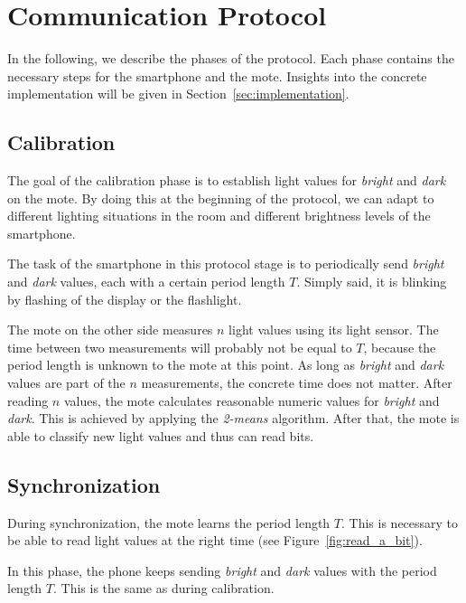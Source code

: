 \documentclass{ewsn-proc} %
\begin{document}
\section{Communication Protocol}
\label{sec:communication_protocol}

In the following, we describe the phases of the protocol.
Each phase contains the necessary steps for the smartphone and the mote.
Insights into the concrete implementation will be given in Section~\ref{sec:implementation}.

\subsection{Calibration}
\label{sub:calibration}

The goal of the calibration phase is to establish light values for \textit{bright} and \textit{dark} on the mote.
By doing this at the beginning of the protocol, we can adapt to different lighting situations in the room and different brightness levels of the smartphone.

The task of the smartphone in this protocol stage is to periodically send \textit{bright} and \textit{dark} values, each with a certain period length $T$.
Simply said, it is blinking by flashing of the display or the flashlight.

The mote on the other side measures $n$ light values using its light sensor.
The time between two measurements will probably not be equal to $T$, because the period length is unknown to the mote at this point.
As long as \textit{bright} and \textit{dark} values are part of the $n$ measurements, the concrete time does not matter.
After reading $n$ values, the mote calculates reasonable numeric values for \textit{bright} and \textit{dark}.
This is achieved by applying the \mbox{\textit{2-means}} algorithm.
After that, the mote is able to classify new light values and thus can read bits.

\subsection{Synchronization}
\label{sub:synchronization}

During synchronization, the mote learns the period length $T$.
This is necessary to be able to read light values at the right time (see Figure~\ref{fig:read_a_bit}).

In this phase, the phone keeps sending \textit{bright} and \textit{dark} values with the period length $T$.
This is the same as during calibration.
\end{document}
